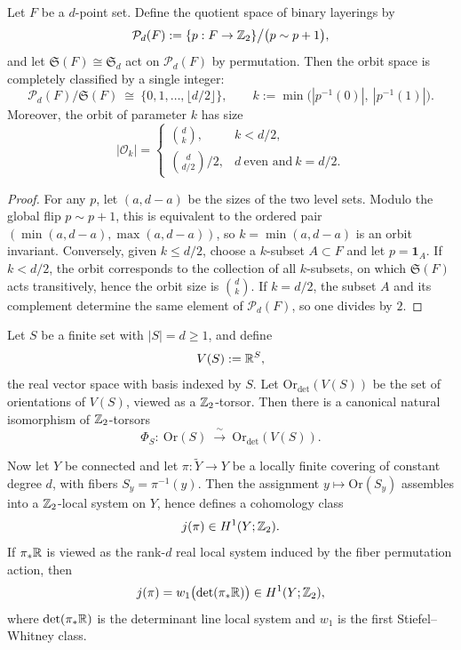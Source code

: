 \begin{proposition}\label{prop:bdry-binary-layering-orbit-classification}
Let \(F\) be a \(d\)-point set.
Define the quotient space of binary layerings by
\[
\mathcal P_d(F):=\{p:F\to\mathbb{Z}_2\}\big/\bigl(p\sim p+1\bigr),
\]
and let \(\mathfrak S(F)\cong\mathfrak S_d\) act on \(\mathcal P_d(F)\) by permutation.
Then the orbit space is completely classified by a single integer:
\[
\mathcal P_d(F)\big/\mathfrak S(F)\ \cong\ \{0,1,\dots,\lfloor d/2\rfloor\},
\qquad
k:=\min\bigl(|p^{-1}(0)|,\ |p^{-1}(1)|\bigr).
\]
Moreover, the orbit of parameter \(k\) has size
\[
|\mathcal O_k|=
\begin{cases}
\binom{d}{k}, & k<d/2,\\[4pt]
\binom{d}{d/2}/2, & d\ \text{even and}\ k=d/2.
\end{cases}
\]
\end{proposition}

\begin{proof}
For any \(p\), let \((a,d-a)\) be the sizes of the two level sets.
Modulo the global flip \(p\sim p+1\), this is equivalent to the ordered pair \((\min(a,d-a),\max(a,d-a))\), so \(k=\min(a,d-a)\) is an orbit invariant.
Conversely, given \(k\le d/2\), choose a \(k\)-subset \(A\subset F\) and let \(p=\mathbf 1_A\).
If \(k<d/2\), the orbit corresponds to the collection of all \(k\)-subsets, on which \(\mathfrak S(F)\) acts transitively, hence the orbit size is \(\binom{d}{k}\).
If \(k=d/2\), the subset \(A\) and its complement determine the same element of \(\mathcal P_d(F)\), so one divides by \(2\).
\end{proof}

\begin{proposition}\label{prop:bdry-orientation-torsor-determinant-realization-jumpclass}
Let \(S\) be a finite set with \(|S|=d\ge 1\), and define
\[
V(S):=\mathbb{R}^{S},
\]
the real vector space with basis indexed by \(S\).
Let \(\mathrm{Or}_{\det}(V(S))\) be the set of orientations of \(V(S)\), viewed as a \(\mathbb{Z}_2\)-torsor.
Then there is a canonical natural isomorphism of \(\mathbb{Z}_2\)-torsors
\[
\Phi_S:\ \mathrm{Or}(S)\ \xrightarrow{\ \sim\ }\ \mathrm{Or}_{\det}(V(S)).
\]
\par
Now let \(Y\) be connected and let \(\pi:\widetilde Y\to Y\) be a locally finite covering of constant degree \(d\), with fibers \(S_y=\pi^{-1}(y)\).
Then the assignment \(y\mapsto \mathrm{Or}(S_y)\) assembles into a \(\mathbb{Z}_2\)-local system on \(Y\), hence defines a cohomology class
\[
j(\pi)\in H^1(Y;\mathbb{Z}_2).
\]
If \(\pi_\ast\mathbb{R}\) is viewed as the rank-\(d\) real local system induced by the fiber permutation action, then
\[
j(\pi)=w_1\bigl(\det(\pi_\ast\mathbb{R})\bigr)\in H^1(Y;\mathbb{Z}_2),
\]
where \(\det(\pi_\ast\mathbb{R})\) is the determinant line local system and \(w_1\) is the first Stiefel--Whitney class.
\end{proposition}

